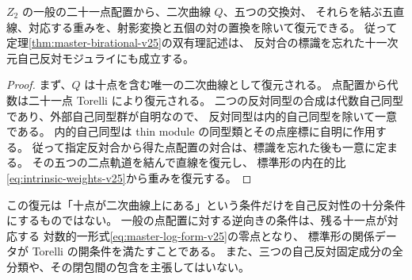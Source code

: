 \begin{corollary}[反対合を忘れた配置からの復元]
\label{cor:unmarked-master-recovery-v25}
$Z_2$ の一般の二十一点配置から、二次曲線 $Q$、五つの交換対、
それらを結ぶ五直線、対応する重みを、射影変換と五個の対の置換を除いて復元できる。
従って定理\ref{thm:master-birational-v25}の双有理記述は、
反対合の標識を忘れた十一次元自己反対モジュライにも成立する。
\end{corollary}
\begin{proof}
まず、$Q$ は十点を含む唯一の二次曲線として復元される。
点配置から代数は二十一点 Torelli により復元される。
二つの反対同型の合成は代数自己同型であり、外部自己同型群が自明なので、
反対同型は内的自己同型を除いて一意である。
内的自己同型は thin module の同型類とその点座標に自明に作用する。
従って指定反対合から得た点配置の対合は、標識を忘れた後も一意に定まる。
その五つの二点軌道を結んで直線を復元し、
標準形の内在的比\eqref{eq:intrinsic-weights-v25}から重みを復元する。
\end{proof}

\begin{remark}
この復元は「十点が二次曲線上にある」という条件だけを自己反対性の十分条件にするものではない。
一般の点配置に対する逆向きの条件は、残る十一点が対応する
対数的一形式\eqref{eq:master-log-form-v25}の零点となり、
標準形の関係データが Torelli の開条件を満たすことである。
また、三つの自己反対固定成分の全分類や、その閉包間の包含を主張してはいない。
\end{remark}
